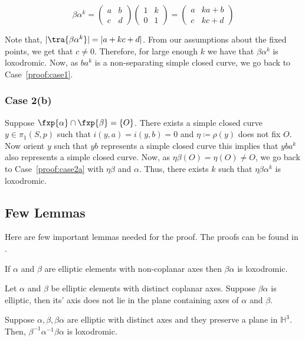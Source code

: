 \[\beta \alpha^k = \begin{pmatrix}
	a & b\\
	c & d
\end{pmatrix}
\begin{pmatrix}
	1 & k\\
	0 & 1
\end{pmatrix} = \begin{pmatrix}
	a & ka+b\\
	c & kc+d
\end{pmatrix}\]

Note that, $|\tra{\beta \alpha^k}| = |a + kc + d|$. From our assumptions about the fixed points, we get that $c \neq 0$. Therefore, for large enough $k$ we have that $\beta \alpha^k$ is loxodromic. Now, as $ba^k$ is a non-separating simple closed curve, we go back to Case~\ref{proof:case1}.

\subsubsection{Case 2(b)}\label{proof:case2b} Suppose $\fxp{\alpha} \cap \fxp{\beta} = \{O\}$. There exists a simple closed curve $y \in \pi_1(S,p)$ such that $i(y,a) = i(y,b) = 0$ and $\eta \coloneqq \rho(y)$ does not fix $O$. Now orient $y$ such that $yb$ represents a simple closed curve this implies that $yba^k$ also represents a simple closed curve. Now, as $\eta \beta (O) = \eta(O) \neq O$, we go back to Case~\ref{proof:case2a} with $\eta \beta$ and $\alpha$. Thus, there exists $k$ such that $\eta \beta \alpha^k$ is loxodromic.

\subsection*{Few Lemmas}

Here are few important lemmas needed for the proof. The proofs can be found in \cite{GKM}.
\begin{lem}\label{lem:ell1}
	If $\alpha$ and $\beta$ are elliptic elements with non-coplanar axes then $\beta \alpha$ is loxodromic.
\end{lem}

\begin{lem}\label{lem:ell2}
	Let $\alpha$ and $\beta$ be elliptic elements with distinct coplanar axes. Suppose $\beta \alpha$ is elliptic, then its' axis does not lie in the plane containing axes of $\alpha$ and $\beta$.
\end{lem}

\begin{lem}\label{lem:ell3}
	Suppose $\alpha, \beta, \beta \alpha$ are elliptic with distinct axes and they preserve a plane in $\mathbb{H}^3$. Then, $\beta^{-1} \alpha^{-1} \beta \alpha$ is loxodromic. 
\end{lem}



